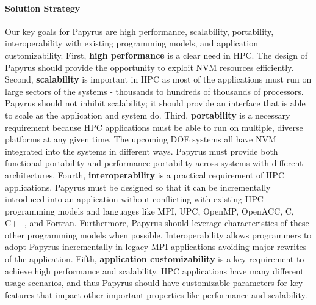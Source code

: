 \paragraph{Solution Strategy}
Our key goals for Papyrus are high performance, scalability, portability, interoperability with existing programming models, and application customizability. First, \textbf{high performance} is a clear need in HPC. The design of Papyrus should provide the opportunity to exploit NVM resources efficiently. Second, \textbf{scalability} is important in HPC as most of the applications must run on large sectors of the systems - thousands to hundreds of thousands of processors. Papyrus should not inhibit scalability; it should provide an interface that is able to scale as the application and system do. Third, \textbf{portability} is a necessary requirement because HPC applications must be able to run on multiple, diverse platforms at any given time. The upcoming DOE systems all have NVM integrated into the systems in different ways. Papyrus must provide both functional portability and performance portability across systems with different architectures. Fourth, \textbf{interoperability} is a practical requirement of HPC applications. Papyrus must be designed so that it can be incrementally introduced into an application without conflicting with existing HPC programming models and languages like MPI, UPC, OpenMP, OpenACC, C, C++, and Fortran. Furthermore, Papyrus should leverage characteristics of these other programming models when possible. Interoperability allows programmers to adopt Papyrus incrementally in legacy MPI applications avoiding major rewrites of the application. Fifth, \textbf{application customizability} is a key requirement to achieve high performance and scalability. HPC applications have many different usage scenarios, and thus Papyrus should have customizable parameters for key features that impact other important properties like performance and scalability.

